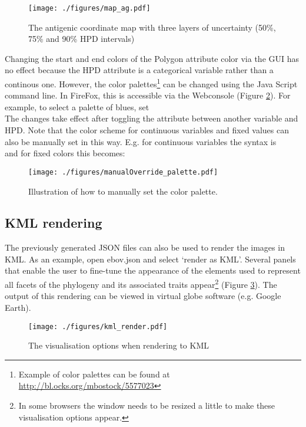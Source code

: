 \documentclass[english]{paper}
\begin{document}
\begin{figure}%
\centering
\texttt{[image: ./figures/map\_ag.pdf]} 
\caption{The antigenic coordinate map with three layers of uncertainty (50\%, 75\% and 90\% HPD intervals)}
\label{fig:mergeTipsTricks}
\end{figure}

Changing the start and end colors of the Polygon attribute color via the GUI has no effect because the HPD attribute is a categorical variable rather than a continous one. 
However, the color palettes\footnote{Example of color palettes can be found at \url{http://bl.ocks.org/mbostock/5577023}} can be changed using the Java Script command line.
In FireFox, this is accessible via the Webconsole (Figure \ref{fig:overridePalette}).
For example, to select a palette of blues, set 
\\
The changes take effect after toggling the attribute between another variable and HPD.
Note that the color scheme for continuous variables and fixed values can also be manually set in this way.
E.g. for continuous variables the syntax is 
\\
and for fixed colors this becomes:
\\

\begin{figure}%
\centering
\texttt{[image: ./figures/manualOverride\_palette.pdf]} 
\caption{Illustration of how to manually set the color palette.}
\label{fig:overridePalette}
\end{figure}


\subsection{KML rendering}
\label{kmlRender}

The previously generated JSON files can also be used to render the images in KML. 
As an example, open ebov.json and select `render as KML'.
Several panels that enable the user to fine-tune the appearance of the elements used to represent all facets of the phylogeny and its associated traits appear\footnote{In some browsers the window needs to be resized a little to make these visualisation options appear.} (Figure \ref{fig:KMLrender}).
The output of this rendering can be viewed in virtual globe software (e.g. Google Earth).

\begin{figure}%
\centering
\texttt{[image: ./figures/kml\_render.pdf]} 
\caption{The visualisation options when rendering to KML}
\label{fig:KMLrender}
\end{figure}
\end{document}
